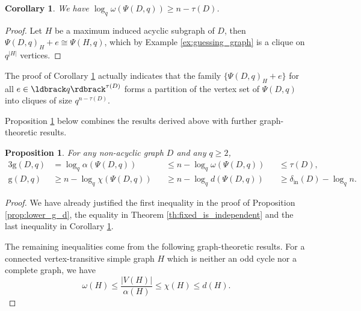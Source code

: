 \documentclass[a4paper, 11pt]{book}
\numberwithin{equation}{section}
\theoremstyle{plain}
\newtheorem{corollary}	[equation]	{Corollary}
\newtheorem{proposition}[equation]	{Proposition}
\newcommand{\dMin}{\delta}
\newcommand{\inn}[1]{#1_\mathrm{in}}
\newcommand{\dInMin}{\inn{\dMin}}
\newcommand{\feedback}{\tau}
\newcommand{\acyclic}{\alpha}
\newcommand{\independence}{\acyclic}
\newcommand{\chromatic}{\chi}
\newcommand{\clique}{\omega}
\newcommand{\guessing}{\mathrm{g}}
\newcommand{\guessingGraph}{\Psi}
\renewcommand{\(}{\ldbrack}
\renewcommand{\)}{\rdbrack}
\begin{document}
\begin{corollary} \label{cor:lower_omega}
We have $\log_q \clique(\guessingGraph(D,q)) \ge n - \feedback(D)$.
\end{corollary}

\begin{proof}
Let $H$ be a maximum induced acyclic subgraph of $D$, then $\guessingGraph(D,q)_H + e \cong \guessingGraph(H,q)$, which by Example \ref{ex:guessing_graph} is a clique on $q^{|H|}$ vertices.
\end{proof}


The proof of Corollary \ref{cor:lower_omega} actually indicates that the family $\{\guessingGraph(D,q)_H + e\}$ for all $e \in \(q\)^{\feedback(D)}$ forms a partition of the vertex set of $\guessingGraph(D,q)$ into cliques of size $q^{n - \feedback(D)}$.

Proposition \ref{prop:summary_bounds} below combines the results derived above with further graph-theoretic results.

\begin{proposition} \label{prop:summary_bounds}
For any non-acyclic graph $D$ and any $q \ge 2$,
\begin{alignat*}{3}
	\guessing(D,q) &= \log_q \alpha(\guessingGraph(D,q)) &&\le n - \log_q \clique(\guessingGraph(D,q)) && \le \feedback(D),\\
	\guessing(D,q) &\ge  n - \log_q \chromatic(\guessingGraph(D,q)) &&\ge  n - \log_q d(\guessingGraph(D,q)) && \ge \dInMin(D) - \log_q n.
\end{alignat*}
\end{proposition}

\begin{proof}
We have already justified the first inequality in the proof of Proposition \ref{prop:lower_g_d}, the equality in Theorem \ref{th:fixed_is_independent} and the last inequality in Corollary \ref{cor:lower_omega}.

The remaining inequalities come from the following graph-theoretic results. For a connected vertex-transitive simple graph $H$ which is neither an odd cycle nor a complete graph, we have \cite[Corollary 7.5.2]{GR01}
\begin{equation} \label{eq:parameters_graph} \nonumber
	\clique(H) \le  \frac{|V(H)|}{\independence(H)} \le \chromatic(H) \le d(H).
\end{equation}
\end{proof}
\end{document}
